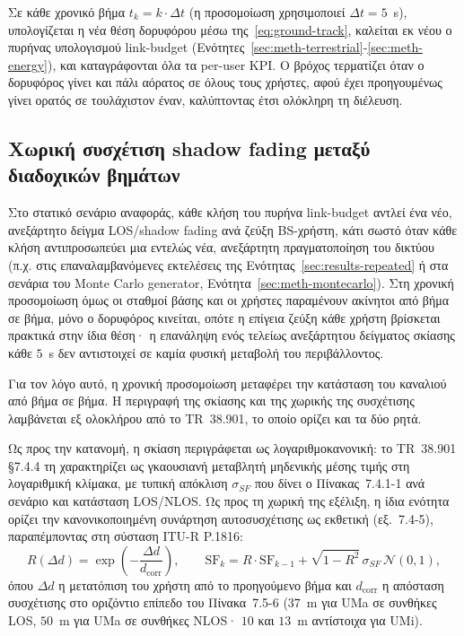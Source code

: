 Σε κάθε χρονικό βήμα $t_k = k \cdot \Delta t$ (η προσομοίωση χρησιμοποιεί
$\Delta t = 5$~s), υπολογίζεται η νέα θέση δορυφόρου μέσω
της~\eqref{eq:ground-track}, καλείται εκ νέου ο πυρήνας υπολογισμού
link-budget (Ενότητες~\ref{sec:meth-terrestrial}-\ref{sec:meth-energy}), και
καταγράφονται όλα τα per-user KPI. Ο βρόχος τερματίζει όταν ο δορυφόρος
γίνει και πάλι αόρατος σε όλους τους χρήστες, αφού έχει προηγουμένως γίνει
ορατός σε τουλάχιστον έναν, καλύπτοντας έτσι ολόκληρη τη διέλευση.

\subsection{Χωρική συσχέτιση shadow fading μεταξύ διαδοχικών βημάτων}
\label{subsec:meth-correlated-sf}

Στο στατικό σενάριο αναφοράς, κάθε κλήση του πυρήνα link-budget αντλεί ένα
νέο, ανεξάρτητο δείγμα LOS/shadow fading ανά ζεύξη BS-χρήστη, κάτι σωστό
όταν κάθε κλήση αντιπροσωπεύει μια εντελώς νέα, ανεξάρτητη πραγματοποίηση
του δικτύου (π.χ. στις επαναλαμβανόμενες εκτελέσεις της
Ενότητας~\ref{sec:results-repeated} ή στα σενάρια του Monte Carlo
generator, Ενότητα~\ref{sec:meth-montecarlo}). Στη χρονική προσομοίωση
όμως οι σταθμοί βάσης και οι χρήστες παραμένουν ακίνητοι από βήμα σε
βήμα, μόνο ο δορυφόρος κινείται, οπότε η επίγεια ζεύξη κάθε χρήστη
βρίσκεται πρακτικά στην ίδια θέση· η επανάληψη ενός τελείως ανεξάρτητου
δείγματος σκίασης κάθε $5$~s δεν αντιστοιχεί σε καμία φυσική μεταβολή του
περιβάλλοντος.

Για τον λόγο αυτό, η χρονική προσομοίωση μεταφέρει την κατάσταση του
καναλιού από βήμα σε βήμα. Η περιγραφή της σκίασης και της χωρικής της
συσχέτισης λαμβάνεται εξ ολοκλήρου από το TR~38.901, το οποίο ορίζει και
τα δύο ρητά.

Ως προς την κατανομή, η σκίαση περιγράφεται ως λογαριθμοκανονική: το
TR~38.901 §7.4.4 τη χαρακτηρίζει ως γκαουσιανή μεταβλητή μηδενικής μέσης
τιμής στη λογαριθμική κλίμακα, με τυπική απόκλιση $\sigma_{SF}$ που δίνει ο
Πίνακας~7.4.1-1 ανά σενάριο και κατάσταση LOS/NLOS. Ως προς τη χωρική της
εξέλιξη, η ίδια ενότητα ορίζει την κανονικοποιημένη συνάρτηση
αυτοσυσχέτισης ως εκθετική (εξ.~7.4-5), παραπέμποντας στη σύσταση ITU-R
P.1816:
\begin{equation}
R(\Delta d) = \exp\!\left(-\frac{\Delta d}{d_{\text{corr}}}\right), \qquad
\text{SF}_k = R \cdot \text{SF}_{k-1}
+ \sqrt{1-R^{2}}\,\sigma_{SF}\,\mathcal{N}(0,1),
\label{eq:correlated-sf}
\end{equation}
όπου $\Delta d$ η μετατόπιση του χρήστη από το προηγούμενο βήμα και
$d_{\text{corr}}$ η απόσταση συσχέτισης στο οριζόντιο επίπεδο του
Πίνακα~7.5-6 ($37$~m για UMa σε συνθήκες LOS, $50$~m για UMa σε συνθήκες
NLOS· $10$ και $13$~m αντίστοιχα για UMi).

